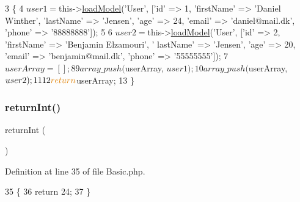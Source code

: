 \begin{DoxyCode}
3                                      \{
4         $user1 = $this->\hyperlink{class_base_controller_a5fa8890bd3a9d20f5c0cc2377dc49eb1}{loadModel}(\textcolor{stringliteral}{'User'}, [\textcolor{stringliteral}{'id'} => 1, \textcolor{stringliteral}{'firstName'} => \textcolor{stringliteral}{'Daniel Winther'}, \textcolor{stringliteral}{'lastName'} 
      => \textcolor{stringliteral}{'Jensen'}, \textcolor{stringliteral}{'age'} => 24, \textcolor{stringliteral}{'email'} => \textcolor{stringliteral}{'daniel@mail.dk'}, \textcolor{stringliteral}{'phone'} => \textcolor{stringliteral}{'88888888'}]);
5 
6         $user2 = $this->\hyperlink{class_base_controller_a5fa8890bd3a9d20f5c0cc2377dc49eb1}{loadModel}(\textcolor{stringliteral}{'User'}, [\textcolor{stringliteral}{'id'} => 2, \textcolor{stringliteral}{'firstName'} => \textcolor{stringliteral}{'Benjamin Elzamouri'}, \textcolor{stringliteral}{'
      lastName'} => \textcolor{stringliteral}{'Jensen'}, \textcolor{stringliteral}{'age'} => 20, \textcolor{stringliteral}{'email'} => \textcolor{stringliteral}{'benjamin@mail.dk'}, \textcolor{stringliteral}{'phone'} => \textcolor{stringliteral}{'55555555'}]);
7         $userArray = [];
8 
9         array\_push($userArray, $user1);
10         array\_push($userArray, $user2);
11 
12         \textcolor{keywordflow}{return} $userArray;
13     \}
\end{DoxyCode}
\hypertarget{class_basic_a8d2918087022004ef5ad62d8f76a73d7}{}\label{class_basic_a8d2918087022004ef5ad62d8f76a73d7} 
\subsubsection{\texorpdfstring{return\+Int()}{returnInt()}}
{\footnotesize\ttfamily return\+Int (\begin{DoxyParamCaption}{ }\end{DoxyParamCaption})}



Definition at line 35 of file Basic.\+php.


\begin{DoxyCode}
35                                 \{
36         \textcolor{keywordflow}{return} 24;
37     \}
\end{DoxyCode}
\hypertarget{class_basic_a7cb6a02987f0faaef2ee4aff9198907e}{}\label{class_basic_a7cb6a02987f0faaef2ee4aff9198907e} 
